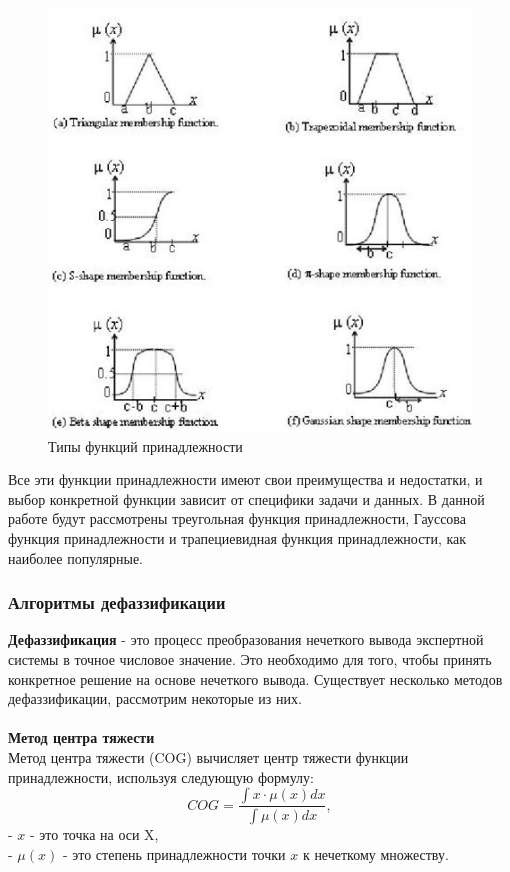 \documentclass{article}
\begin{document}
    \begin{figure}[h]
        \centering
        \includegraphics[draft=false,width=0.5\linewidth]{all}
        \caption{Типы функций принадлежности}
        \label{ris:image}
    \end{figure}
    Все эти функции принадлежности имеют свои преимущества и недостатки, и выбор конкретной функции зависит от специфики задачи и данных. В данной работе будут рассмотрены треугольная функция принадлежности, Гауссова функция принадлежности и трапециевидная функция принадлежности, как наиболее популярные.
    \subsubsection{Алгоритмы дефаззификации}
    \textbf{Дефаззификация} - это процесс преобразования нечеткого вывода экспертной системы в точное числовое значение. Это необходимо для того, чтобы принять конкретное решение на основе нечеткого вывода. Существует несколько методов дефаззификации, рассмотрим некоторые из них.\\
    ~\\
    \textbf{Метод центра тяжести}\\
    Метод центра тяжести (COG) вычисляет центр тяжести функции принадлежности, используя следующую формулу:\\

    \[
        COG = \frac{\int x \cdot \mu(x) dx}{\int \mu(x) dx},
    \]
    - \(x\) - это точка на оси X,\\
    - \(\mu(x)\) - это степень принадлежности точки \(x\) к нечеткому множеству.\\
\end{document}
